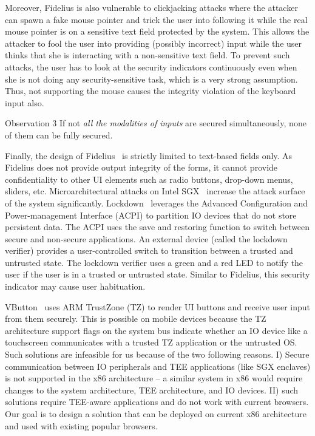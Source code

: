 Moreover, Fidelius is also vulnerable to clickjacking attacks where the attacker can spawn a fake mouse pointer and trick the user into following it while the real mouse pointer is on a sensitive text field protected by the system. This allows the attacker to fool the user into providing (possibly incorrect) input while the user thinks that she is interacting with a non-sensitive text field. To prevent such attacks, the user has to look at the security indicators continuously even when she is not doing any security-sensitive task, which is a very strong assumption. 
Thus, not supporting the mouse causes the integrity violation of the keyboard input also.


\begin{mybox}[colback=white]{Observation 3}
If not \emph{all the modalities of inputs} are secured simultaneously, none of them can be fully secured.
\end{mybox}



Finally, the design of Fidelius~\cite{Fidelius} is strictly limited to text-based fields only. As Fidelius does not provide output integrity of the forms, it cannot provide confidentiality to other UI elements such as radio buttons, drop-down menus, sliders, etc.
Microarchitectural attacks on Intel SGX~\cite{van2018foreshadow} increase the attack surface of the system significantly. Lockdown~\cite{vasudevan2012lockdown} leverages the Advanced Configuration and Power-management Interface (ACPI) to partition IO devices that do not store persistent data. The ACPI uses the save and restoring function to switch between secure and non-secure applications. An external device (called the lockdown verifier) provides a user-controlled switch to transition between a trusted and untrusted state. The lockdown verifier uses a green and a red LED to notify the user if the user is in a trusted or untrusted state. Similar to Fidelius, this security indicator may cause user habituation.


 VButton~\cite{li2018vbutton} uses ARM TrustZone (TZ) to render UI buttons and receive user input from them securely. This is possible on mobile devices because the TZ architecture support flags on the system bus indicate whether an IO device like a touchscreen communicates with a trusted TZ application or the untrusted OS. Such solutions are infeasible for us because of the two following reasons. I) Secure communication between IO peripherals and TEE applications (like SGX enclaves) is not supported in the x86 architecture -- a similar system in x86 would require changes to the system architecture, TEE architecture, and IO devices. II) such solutions require TEE-aware applications and do not work with current browsers. Our goal is to design a solution that can be deployed on current x86 architecture and used with existing popular browsers.

